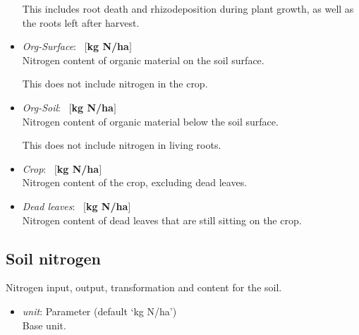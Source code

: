 \documentclass[a4paper]{article}
\begin{document}
\begin{itemize}
This includes root death and rhizodeposition during plant growth,
as well as the roots left after harvest.
\item \textit{Org-Surface}: ~$[$\textbf{kg N/ha}$]$\\
Nitrogen content of organic material on the soil surface.

This does not include nitrogen in the crop.
\item \textit{Org-Soil}: ~$[$\textbf{kg N/ha}$]$\\
Nitrogen content of organic material below the soil surface.

This does not include nitrogen in living roots.
\item \textit{Crop}: ~$[$\textbf{kg N/ha}$]$\\
Nitrogen content of the crop, excluding dead leaves.
\item \textit{Dead leaves}: ~$[$\textbf{kg N/ha}$]$\\
Nitrogen content of dead leaves that are still sitting on the crop.
\end{itemize}

\subsection{Soil nitrogen}

Nitrogen input, output, transformation and content for the soil.
\begin{itemize}
\item \textit{unit}: Parameter (default `kg N/ha')\\
Base unit.
\end{itemize}
\end{document}
